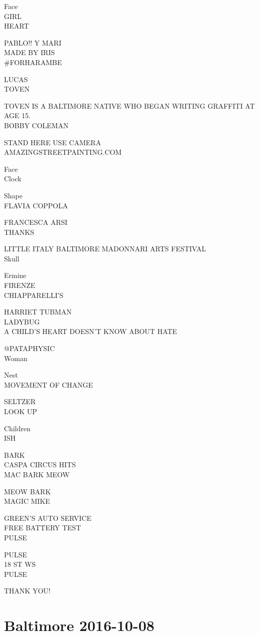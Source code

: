 \documentclass[10pt,letterpaper]{article}
\begin{document}
Face\\
GIRL\\
HEART

PABLO!! Y MARI\\
MADE BY IRIS\\
\#FORHARAMBE

LUCAS\\
TOVEN

TOVEN IS A BALTIMORE NATIVE WHO BEGAN WRITING GRAFFITI AT AGE 15.\\
BOBBY COLEMAN

STAND HERE USE CAMERA\\
AMAZINGSTREETPAINTING.COM

Face\\
Clock

Shape\\
FLAVIA COPPOLA

FRANCESCA ARSI\\
THANKS

LITTLE ITALY BALTIMORE MADONNARI ARTS FESTIVAL\\
Skull

Ermine\\
FIRENZE\\
CHIAPPARELLI'S

HARRIET TUBMAN\\
LADYBUG\\
A CHILD'S HEART DOESN'T KNOW ABOUT HATE

@PATAPHYSIC\\
Woman

Nest\\
MOVEMENT OF CHANGE

SELTZER\\
LOOK UP

Children\\
ISH

BARK\\
CASPA CIRCUS HITS\\
MAC BARK MEOW

MEOW BARK\\
MAGIC MIKE

GREEN'S AUTO SERVICE\\
FREE BATTERY TEST\\
PULSE

PULSE\\
18 ST WS\\
PULSE

THANK YOU!
\pagebreak

\section*{Baltimore 2016-10-08}
\end{document}
